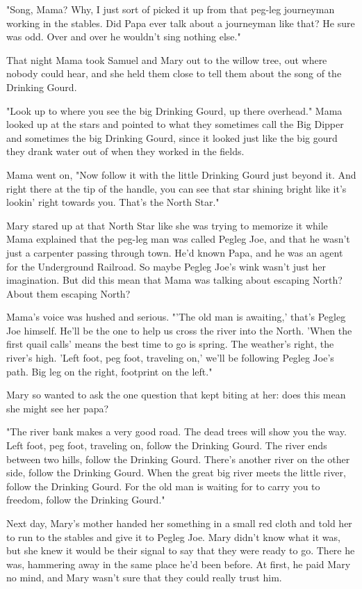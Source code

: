 "Song, Mama? Why, I just sort of picked it up from that peg-leg journeyman working in the stables. Did Papa ever talk about a journeyman like that? He sure was odd. Over and over he wouldn't sing nothing else."

That night Mama took Samuel and Mary out to the willow tree, out where nobody could hear, and she held them close to tell them about the song of the Drinking Gourd.

"Look up to where you see the big Drinking Gourd, up there overhead." Mama looked up at the stars and pointed to what they sometimes call the Big Dipper and sometimes the big Drinking Gourd, since it looked just like the big gourd they drank water out of when they worked in the fields.

Mama went on, "Now follow it with the little Drinking Gourd just beyond it. And right there at the tip of the handle, you can see that star shining bright like it's lookin' right towards you. That's the North Star."

Mary stared up at that North Star like she was trying to memorize it while Mama explained that the peg-leg man was called Pegleg Joe, and that he wasn't just a carpenter passing through town. He'd known Papa, and he was an agent for the Underground Railroad. So maybe Pegleg Joe's wink wasn't just her imagination. But did this mean that Mama was talking about escaping North? About them escaping North?

Mama's voice was hushed and serious. "'The old man is awaiting,' that's Pegleg Joe himself. He'll be the one to help us cross the river into the North. 'When the first quail calls' means the best time to go is spring. The weather's right, the river's high. 'Left foot, peg foot, traveling on,' we'll be following Pegleg Joe's path. Big leg on the right, footprint on the left."

Mary so wanted to ask the one question that kept biting at her: does this mean she might see her papa?

"The river bank makes a very good road. The dead trees will show you the way. Left foot, peg foot, traveling on, follow the Drinking Gourd. The river ends between two hills, follow the Drinking Gourd. There's another river on the other side, follow the Drinking Gourd. When the great big river meets the little river, follow the Drinking Gourd. For the old man is waiting for to carry you to freedom, follow the Drinking Gourd."

Next day, Mary's mother handed her something in a small red cloth and told her to run to the stables and give it to Pegleg Joe. Mary didn't know what it was, but she knew it would be their signal to say that they were ready to go. There he was, hammering away in the same place he'd been before. At first, he paid Mary no mind, and Mary wasn't sure that they could really trust him.

